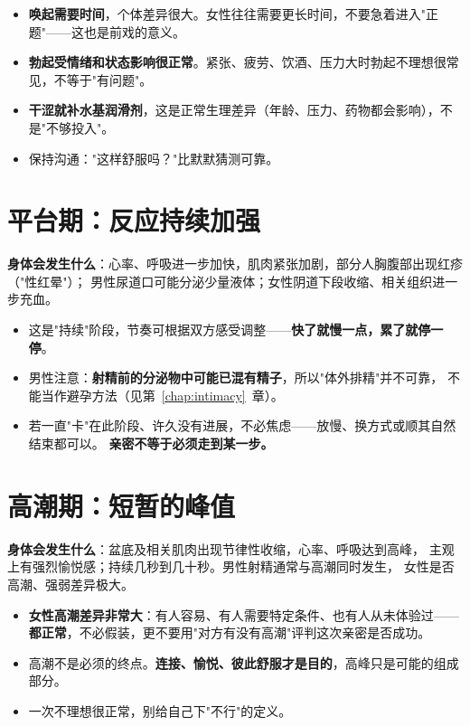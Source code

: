 \documentclass[12pt,UTF8,openany]{ctexbook}
\begin{document}
\begin{itemize}[leftmargin=2em]
  \item \textbf{唤起需要时间}，个体差异很大。女性往往需要更长时间，不要急着进入"正题"——这也是前戏的意义。
  \item \textbf{勃起受情绪和状态影响很正常}。紧张、疲劳、饮酒、压力大时勃起不理想很常见，不等于"有问题"。
  \item \textbf{干涩就补水基润滑剂}，这是正常生理差异（年龄、压力、药物都会影响），不是"不够投入"。
  \item 保持沟通："这样舒服吗？"比默默猜测可靠。
\end{itemize}

\section{平台期：反应持续加强}

\textbf{身体会发生什么}：心率、呼吸进一步加快，肌肉紧张加剧，部分人胸腹部出现红疹（"性红晕"）；
男性尿道口可能分泌少量液体；女性阴道下段收缩、相关组织进一步充血。

\begin{itemize}[leftmargin=2em]
  \item 这是"持续"阶段，节奏可根据双方感受调整——\textbf{快了就慢一点，累了就停一停}。
  \item 男性注意：\textbf{射精前的分泌物中可能已混有精子}，所以"体外排精"并不可靠，
        不能当作避孕方法（见第~\ref{chap:intimacy}~章）。
  \item 若一直"卡"在此阶段、许久没有进展，不必焦虑——放慢、换方式或顺其自然结束都可以。
        \textbf{亲密不等于必须走到某一步。}
\end{itemize}

\section{高潮期：短暂的峰值}

\textbf{身体会发生什么}：盆底及相关肌肉出现节律性收缩，心率、呼吸达到高峰，
主观上有强烈愉悦感；持续几秒到几十秒。男性射精通常与高潮同时发生，
女性是否高潮、强弱差异极大。

\begin{itemize}[leftmargin=2em]
  \item \textbf{女性高潮差异非常大}：有人容易、有人需要特定条件、也有人从未体验过——
        \textbf{都正常}，不必假装，更不要用"对方有没有高潮"评判这次亲密是否成功。
  \item 高潮不是必须的终点。\textbf{连接、愉悦、彼此舒服才是目的}，高峰只是可能的组成部分。
  \item 一次不理想很正常，别给自己下"不行"的定义。
\end{itemize}
\end{document}

